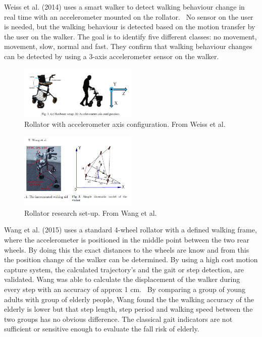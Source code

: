 Weiss et al. (2014) uses a smart walker to detect walking behaviour change in real time with an accelerometer mounted on the rollator.~\cite{Weiss2014} No sensor on the user is needed, but the walking behaviour is detected based on the motion transfer by the user on the walker. The goal is to identify five different classes: no movement, movement, slow, normal and fast. They confirm that walking behaviour changes can be detected by using a 3-axis accelerometer sensor on the walker.~\cite{Weiss2014}

\begin{figure}[h]
\includegraphics[width=0.5\textwidth]{img/B_Weiss.png}
\centering
\caption[Rollator with accelerometer axis configuration]{Rollator with accelerometer axis configuration. From Weiss et al.~\cite{Weiss2014} \label{rolaxis}}
\end{figure}
\begin{figure}[h]
\includegraphics[width=0.5\textwidth]{img/B_Wang.jpg}
\centering
\caption[Rollator set-up]{Rollator research set-up. From Wang et al.~\cite{Wang2015} \label{rolsetup}}
\end{figure}

Wang et al. (2015) uses a standard 4-wheel rollator with a defined walking frame, where the accelerometer is positioned in the middle point between the two rear wheels. By doing this the exact distances to the wheels are know and from this the position change of the walker can be determined. By using a high cost motion capture system, the calculated trajectory's and the gait or step detection, are validated. Wang was able to calculate the displacement of the walker during every step with an accuracy of approx 1 cm.~\cite{Wang2015} By comparing a group of young adults with group of elderly people, Wang found the the walking accuracy of the elderly is lower but that step length, step period and walking speed between the two groups has no obvious difference. The classical gait indicators are not sufficient or sensitive enough to evaluate the fall risk of elderly.~\cite{Wang2015}

